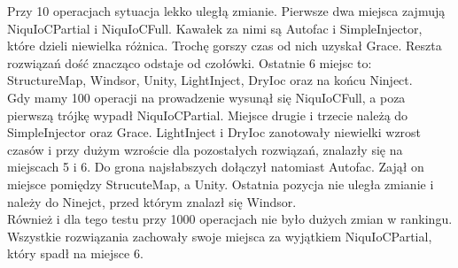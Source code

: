 \documentclass[12pt]{article}
\begin{document}
Przy 10 operacjach sytuacja lekko uległą zmianie. Pierwsze dwa miejsca zajmują NiquIoCPartial i NiquIoCFull. Kawałek za nimi są Autofac i SimpleInjector, które dzieli niewielka różnica. Trochę gorszy czas od nich uzyskał Grace. Reszta rozwiązań dość znacząco odstaje od czołówki. Ostatnie 6 miejsc to: StructureMap, Windsor, Unity, LightInject, DryIoc oraz na końcu Ninject.\\
Gdy mamy 100 operacji na prowadzenie wysunął się NiquIoCFull, a poza pierwszą trójkę wypadł NiquIoCPartial. Miejsce drugie i trzecie należą do SimpleInjector oraz Grace. LightInject i DryIoc zanotowały niewielki wzrost czasów i przy dużym wzroście dla pozostałych rozwiązań, znalazły się na miejscach 5 i 6. Do grona najsłabszych dołączył natomiast Autofac. Zajął on miejsce pomiędzy StrucuteMap, a Unity. Ostatnia pozycja nie uległa zmianie i należy do Ninejct, przed którym znalazł się Windsor.\\
Również i dla tego testu przy 1000 operacjach nie było dużych zmian w rankingu. Wszystkie rozwiązania zachowały swoje miejsca za wyjątkiem NiquIoCPartial, który spadł na miejsce 6.
\end{document}
